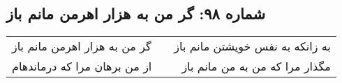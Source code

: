 \begin{center}
\section*{شماره ۹۸: گر من به هزار اهرمن مانم باز}
\label{sec:098}
\begin{longtable}{l p{0.5cm} r}
گر من به هزار اهرمن مانم باز
&&
به زانکه به نفس خویشتن مانم باز
\\
از من برهان مرا که درماندهام
&&
مگذار مرا که من به من مانم باز
\\
\end{longtable}
\end{center}

